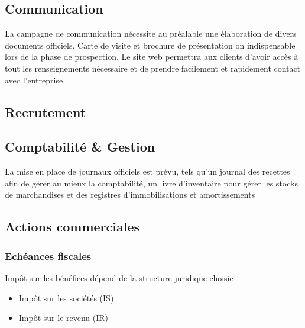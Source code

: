 \documentclass[10pt]{article}
\begin{document}

\subsection{Communication}
\label{sub:communication}
La campagne de communication nécessite au préalable une élaboration de divers documents officiels. Carte de visite et brochure de présentation on indispensable lors de la phase de prospection. Le site web permettra aux clients d'avoir accès à tout les renseignements nécessaire et de prendre facilement et rapidement contact avec l'entreprise.

\subsection{Recrutement}
\label{sub:recrutement}


\subsection{Comptabilité \& Gestion}
\label{sub:comptabilité_gestion}
La mise en place de journaux officiels est prévu, tels qu'un journal des recettes afin de gérer au mieux la comptabilité, un livre d'inventaire pour gérer les stocks de marchandises et des registres d'immobilisations et amortissements

\subsection{Actions commerciales}
\label{sub:actions_commerciales}


\subsubsection{Echéances fiscales}
\label{ssub:echéance_fiscales}

Impôt sur les bénéfices dépend de la structure juridique choisie 
\begin{itemize}
	\item Impôt sur les sociétés (IS)
	\item Impôt sur le revenu (IR) \\
\end{itemize}

\end{document}
